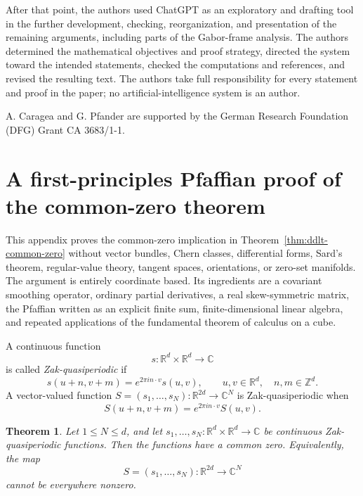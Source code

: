 \documentclass[11pt,reqno]{amsart}
\numberwithin{equation}{section}
\newtheorem{theorem}{Theorem}[section]
\theoremstyle{definition}
\theoremstyle{remark}
\newcommand{\R}{\mathbb R}
\newcommand{\Z}{\mathbb Z}
\newcommand{\C}{\mathbb C}
\begin{document}
After that point, the authors used ChatGPT as an exploratory and drafting
tool in the further development, checking, reorganization, and presentation
of the remaining arguments, including parts of the Gabor-frame analysis.
The authors determined the mathematical objectives and proof strategy,
directed the system toward the intended statements, checked the
computations and references, and revised the resulting text.  The authors
take full responsibility for every statement and proof in the paper; no
artificial-intelligence system is an author.

A. Caragea and G. Pfander are supported by the German Research Foundation
(DFG) Grant CA 3683/1-1.

\appendix
\section{A first-principles Pfaffian proof of the common-zero theorem}
\label{app:pfaffian-common-zero}

This appendix proves the common-zero implication in
Theorem~\ref{thm:ddlt-common-zero} without vector bundles, Chern classes,
differential forms, Sard's theorem, regular-value theory, tangent spaces,
orientations, or zero-set manifolds.  The argument is entirely coordinate
based.  Its ingredients are a covariant smoothing operator, ordinary
partial derivatives, a real skew-symmetric matrix, the Pfaffian written as
an explicit finite sum, finite-dimensional linear algebra, and repeated
applications of the fundamental theorem of calculus on a cube.

A continuous function
\[
 s:\R^d\times\R^d\longrightarrow\C
\]
is called \emph{Zak-quasiperiodic} if
\begin{equation}\label{pf-eq:scalar-qp}
 s(u+n,v+m)=e^{2\pi i n\cdot v}s(u,v),
 \qquad u,v\in\R^d,\quad n,m\in\Z^d.
\end{equation}
A vector-valued function
$S=(s_1,\ldots,s_N):\R^{2d}\to\C^N$ is Zak-quasiperiodic when
\begin{equation}\label{pf-eq:vector-qp}
 S(u+n,v+m)=e^{2\pi i n\cdot v}S(u,v).
\end{equation}

\begin{theorem}\label{pf-thm:common-zero}
Let $1\le N\le d$, and let
$s_1,\ldots,s_N:\R^d\times\R^d\to\C$ be continuous
Zak-quasiperiodic functions.  Then the functions have a common zero.
Equivalently, the map
\[
 S=(s_1,\ldots,s_N):\R^{2d}\longrightarrow\C^N
\]
cannot be everywhere nonzero.
\end{theorem}
\end{document}
